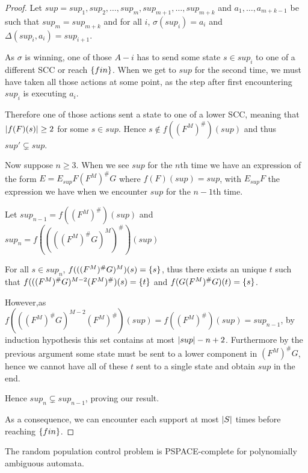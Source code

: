 \documentclass{article}
\begin{document}
\begin{proof}
	Let $sup = sup_1, sup_2, \ldots, sup_m, sup_{m+1}, \ldots, sup_{m+k}$ and $a_1, \ldots, a_{m+k-1}$ be such that $sup_m = sup_{m+k}$ and for all $i$, $\sigma(sup_i) = a_i$ and $\Delta(sup_i, a_i) = sup_{i+1}$.
	
	As $\sigma$ is winning, one of those $A-i$ has to send some state $s \in sup_i$ to one of a different SCC or reach $\{ fin \}$.
	When we get to $sup$ for the second time, we must have taken all those actions at some point, as the step after first encountering $sup_i$ is executing $a_i$.
	
	Therefore one of those actions sent a state to one of a lower SCC, meaning that $|f(F)(s)|\geq 2$ for some $s \in sup$.
	Hence $s \notin f((F^M)^\#)(sup)$ and thus $sup' \subsetneq sup$.
	
	Now suppose $n\geq 3$.
	When we see $sup$ for the $n$th time we have an expression of the form $E = E_{sup} F (F^M)^\# G$ where $f(F) (sup) = sup$, with $E_{sup} F$ the expression we have when we encounter $sup$ for the $n-1$th time.
	
	Let $sup_{n-1} = f((F^M)^\#) (sup)$ and $sup_{n} = f((((F^M)^\# G)^M)^\#) (sup)$
	
	For all $s \in sup_n$, $f(((F^M)^\# G)^M)(s) = \{ s \}$, thus there exists an unique $t$ such that $f(((F^M)^\# G)^{M-2} (F^M)^\# )(s) = \{ t \}$ and $f(G(F^M)^\# G)(t) = \{ s \}$.
	
	However,as $f(((F^M)^\# G)^{M-2} (F^M)^\#) (sup) = f((F^M)^\#)(sup) = sup_{n-1}$, by induction hypothesis this set contains at most $|sup|-n+2$. Furthermore by the previous argument some state must be sent to a lower component in $(F^M)^\# G$, hence we cannot have all of these $t$ sent to a single state and obtain $sup$ in the end.
	
	Hence $sup_n \subsetneq sup_{n-1}$, proving our result.
	
	As a consequence, we can encounter each support at most $|S|$ times before reaching $\{ fin \}$.
\end{proof}

\begin{proposition}
	The random population control problem is PSPACE-complete for polynomially ambiguous automata.
\end{proposition}
\end{document}
